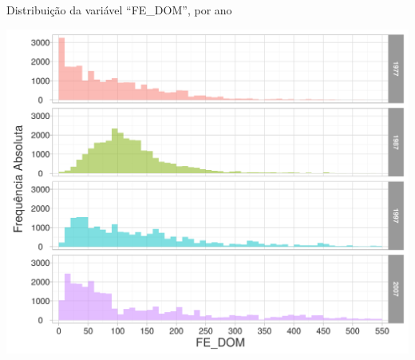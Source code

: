 \begin{grafico}[htb]%
    \caption{\label{graf:freq-abs-fe-dom}Distribuição da variável ``FE_DOM'', por ano}%
    \begin{center}%
        \includegraphics[width=1\textwidth]{./imagens/freq-abs-fe-dom.png}%
    \end{center}%
\end{grafico}%


\clearpage

